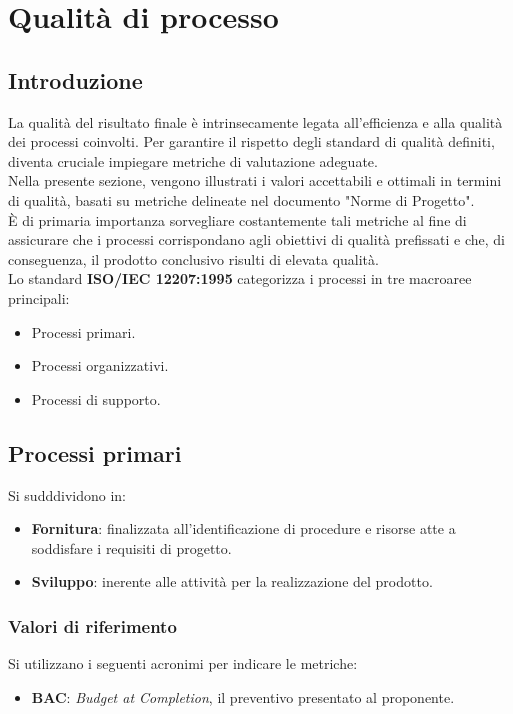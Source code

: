 \section{Qualità di processo}
\subsection{Introduzione}
La qualità del risultato finale è intrinsecamente legata all'efficienza e alla qualità dei processi coinvolti. 
Per garantire il rispetto degli standard di qualità definiti, diventa cruciale impiegare metriche di valutazione adeguate.\\
Nella presente sezione, vengono illustrati i valori accettabili e ottimali in termini di qualità, basati su metriche delineate nel documento "Norme di Progetto". \\
È di primaria importanza sorvegliare costantemente tali metriche al fine di assicurare che i processi corrispondano agli obiettivi di qualità prefissati e che, di conseguenza, il prodotto conclusivo risulti di elevata qualità.\\

\noindent
Lo standard \textbf{ISO/IEC 12207:1995} categorizza i processi in tre macroaree principali:
\begin{itemize}
    \item Processi primari.
    \item Processi organizzativi.
    \item Processi di supporto.
\end{itemize}


\subsection{Processi primari}
Si sudddividono in:
\begin{itemize}
    \item \textbf{Fornitura}: finalizzata all'identificazione di procedure e risorse atte a soddisfare i requisiti di progetto.
    \item \textbf{Sviluppo}: inerente alle attività per la realizzazione del prodotto.
\end{itemize}

\subsubsection{Valori di riferimento}
Si utilizzano i seguenti acronimi per indicare le metriche:
\begin{itemize}
    \item \textbf{BAC}: \textit{Budget at Completion}, il preventivo presentato al proponente.
\end{itemize}

